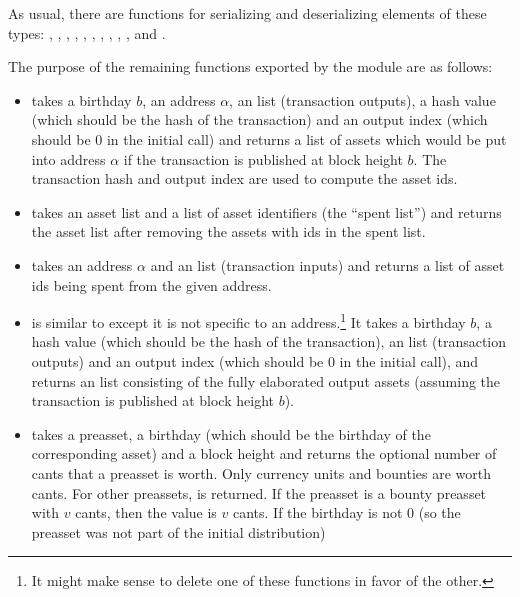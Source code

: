 As usual, there are functions for serializing and deserializing elements of these types:
{},
{},
{},
{},
{},
{},
{},
{},
{},
{},
{}
and
{}.

The purpose of the remaining functions exported by the {} module are as follows:
\begin{itemize}
\item {} takes a birthday $b$, an address $\alpha$,
an {} list (transaction outputs), a hash value (which should
be the hash of the transaction)
and an output index (which should be $0$ in the initial call)
and returns a list of assets which would be put into address $\alpha$
if the transaction is published at block height $b$.
The transaction hash and output index are used to compute the asset ids.
\item {} takes an asset list and a list of asset identifiers (the ``spent list'') and
returns the asset list after removing the assets with ids in the spent list.
\item {} takes an address $\alpha$ and an {} list (transaction inputs)
and returns a list of asset ids being spent from the given address.
\item {} is similar to {} except it is not specific to an address.\footnote{It might make sense to delete one of these functions in favor of the other.}
It takes a birthday $b$, a hash value (which should be the hash of the transaction),
an {} list (transaction outputs)
and an output index (which should be $0$ in the initial call),
and returns an {} list consisting of the fully elaborated output assets
(assuming the transaction is published at block height $b$).
\item {} takes a preasset, a birthday (which should
be the birthday of the corresponding asset) and a block height
and returns the optional number of cants that a preasset is worth.
Only currency units and bounties are worth cants. For other preassets, {} is returned.
If the preasset is a bounty preasset with $v$ cants, then the value is $v$ cants.
If the birthday is not $0$ (so the preasset was not part of the initial distribution)

\end{itemize}
